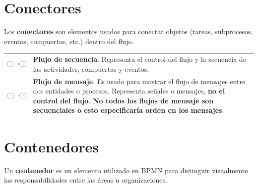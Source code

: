 \section{Conectores}

Los {\bf conectores} son elementos usados para conectar objetos (tareas, subprocesos, eventos, compuertas, etc.) dentro del flujo.\\

	\begin{tabular}{| m{}  m{} | }%
		\rowcolor[gray]{0.97}%
		\centering\noindent\includegraphics[width=120pt]{introduccion/imagenes/procesos/bpmn/SequenceFlow.png} & {\bf Flujo de secuencia}. Representa el control del flujo y la secuencia de las actividades, compuertas y eventos. \\
		\centering\noindent\includegraphics[width=120pt]{introduccion/imagenes/procesos/bpmn/MessageFlow.png} & {\bf Flujo de mensaje}. Es usado para mostrar el flujo de mensajes entre dos entidades o procesos. Representa señales o mensajes, {\bf no el control del flujo}. {\bf No todos los flujos de mensaje son secuenciales o esto especificaría orden en los mensajes}.
	\end{tabular}%


\section{Contenedores}

Un {\bf contenedor} es un elemento utilizado en BPMN para distinguir visualmente las responsabilidades entre las áreas u organizaciones.\\

